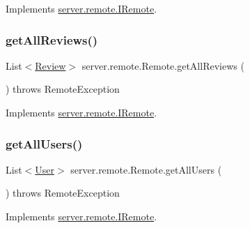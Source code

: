 Implements \hyperlink{interfaceserver_1_1remote_1_1_i_remote_a2bcc3db515d7b6f420449bcf6367298c}{server.\+remote.\+I\+Remote}.

\mbox{\label{classserver_1_1remote_1_1_remote_a22538e64b45f5f93237b455100243b44}} 
\subsubsection{\texorpdfstring{get\+All\+Reviews()}{getAllReviews()}}
{\footnotesize\ttfamily List$<$\hyperlink{classserver_1_1data_1_1_review}{Review}$>$ server.\+remote.\+Remote.\+get\+All\+Reviews (\begin{DoxyParamCaption}{ }\end{DoxyParamCaption}) throws Remote\+Exception}



Implements \hyperlink{interfaceserver_1_1remote_1_1_i_remote_a017e07cb93ae582188c20d7b1ce6b014}{server.\+remote.\+I\+Remote}.

\mbox{\label{classserver_1_1remote_1_1_remote_a3d41acc8ab7328be2082573542758f07}} 
\subsubsection{\texorpdfstring{get\+All\+Users()}{getAllUsers()}}
{\footnotesize\ttfamily List$<$\hyperlink{classserver_1_1data_1_1_user}{User}$>$ server.\+remote.\+Remote.\+get\+All\+Users (\begin{DoxyParamCaption}{ }\end{DoxyParamCaption}) throws Remote\+Exception}



Implements \hyperlink{interfaceserver_1_1remote_1_1_i_remote_a3ff8752a1911b6ca54fc4a04af90fe7a}{server.\+remote.\+I\+Remote}.

\mbox{\label{classserver_1_1remote_1_1_remote_a36ffc6f95ea75ad7d393ea296e1bc0cc}} 

